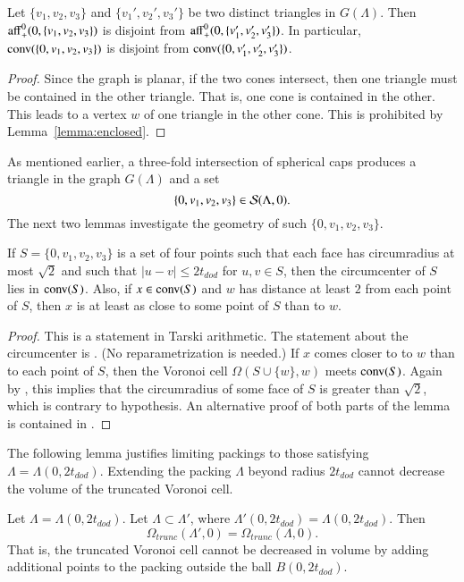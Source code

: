 \begin{lemma}  Let $\{v_1,v_2,v_3\}$ and $\{v_1',v_2',v_3'\}$
be two distinct triangles in $G(\Lambda)$.  Then
${\operatorname{aff}}_+^0(0,\{v_1,v_2,v_3\})$ is disjoint from
${\operatorname{aff}}_+^0(0,\{v_1',v_2',v_3'\})$.  In particular,
${\operatorname{conv}}(\{0,v_1,v_2,v_3\})$ is disjoint from
${\operatorname{conv}}(\{0,v_1',v_2',v_3'\})$.
\end{lemma}

\begin{proof} Since the graph is planar, if the two cones
intersect, then one triangle must be contained in the other
triangle.  That is, one cone is contained in the other.  This
leads to a vertex $w$ of one triangle in the other
cone.  This is prohibited
by Lemma~\ref{lemma:enclosed}.
\end{proof}

As mentioned earlier, a three-fold intersection of spherical
caps produces a triangle in the graph $G(\Lambda)$ and a 
set 
$$\{0,v_1,v_2,v_3\}\in {\mathcal S}(\Lambda,0).$$
The next two lemmas investigate the geometry of such $\{0,v_1,v_2,v_3\}$.

\begin{lemma}\label{lemma:Q}
If $S=\{0,v_1,v_2,v_3\}$ is a set of four points such that each
face has circumradius at most $\sqrt2$ and such that
$|u-v|\le 2t_{dod}$ for $u,v\in S$, then
the circumcenter of $S$ lies in ${\operatorname{conv}}(S)$.  Also, if $x
\in {\operatorname{conv}}(S)$ and $w$ has distance at least $2$ from each
point of $S$, then $x$ is at least as close to some point of $S$ than to
$w$.
\end{lemma}

\begin{proof} This is a statement in Tarski arithmetic.
The statement about the circumcenter is \cite[Lemma~5.18]{DCG}.
(No reparametrization is needed.)
If $x$  comes closer to  to $w$  than to each point of $S$, then
the Voronoi cell $\Omega(S\cup\{w\},w)$ meets ${\operatorname{conv}}(S)$.
Again by \cite[Lemma~5.18]{DCG}, this implies that the circumradius
of some face of $S$ is greater than $\sqrt2$, which is contrary
to hypothesis. An alternative proof 
of both parts of the lemma
is contained in \cite[Lemma~3.5,3.6]{arx}.
\end{proof}

The following lemma justifies limiting packings to those
satisfying $\Lambda=\Lambda(0,2t_{dod})$.  Extending the packing
$\Lambda$ beyond radius $2t_{dod}$ cannot decrease the volume of the
truncated Voronoi cell.

\begin{lemma}\label{lemma:trunc}  
Let $\Lambda=\Lambda(0,2t_{dod})$.  Let $\Lambda\subset\Lambda'$,
where $\Lambda'(0,2t_{dod}) = \Lambda(0,2t_{dod})$.  Then
$$\Omega_{trunc}(\Lambda',0) = \Omega_{trunc}(\Lambda,0).
$$
That is, the truncated Voronoi cell cannot be decreased in volume by
adding additional points to the packing outside the ball $B(0,2t_{dod})$.
\end{lemma}


